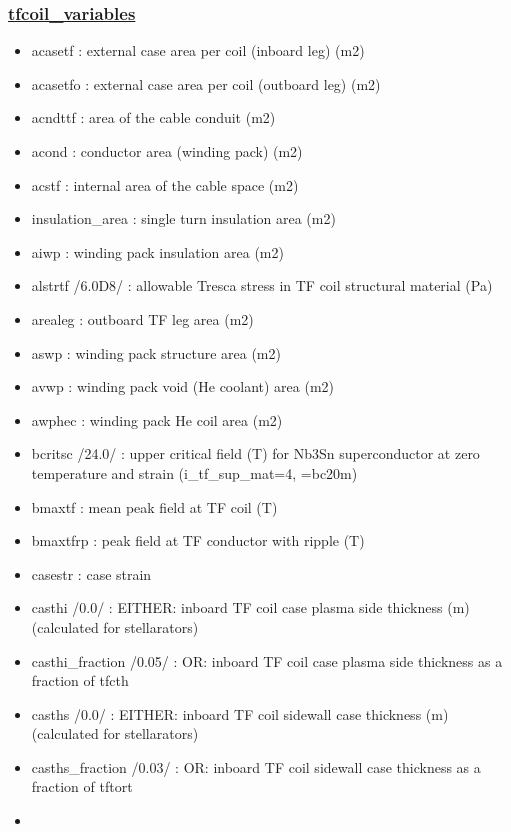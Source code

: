 \documentclass[]{article}
\begin{document}
\hypertarget{tfcoil_variables}{%
\subsubsection{\texorpdfstring{\href{tfcoil_variables.html}{tfcoil\_variables}}{tfcoil\_variables}}\label{tfcoil_variables}}

\begin{itemize}
\item
  acasetf : external case area per coil (inboard leg) (m2)
\item
  acasetfo : external case area per coil (outboard leg) (m2)
\item
  acndttf : area of the cable conduit (m2)
\item
  acond : conductor area (winding pack) (m2)
\item
  acstf : internal area of the cable space (m2)
\item
  insulation\_area : single turn insulation area (m2)
\item
  aiwp : winding pack insulation area (m2)
\item
  alstrtf /6.0D8/ : allowable Tresca stress in TF coil structural
  material (Pa)
\item
  arealeg : outboard TF leg area (m2)
\item
  aswp : winding pack structure area (m2)
\item
  avwp : winding pack void (He coolant) area (m2)
\item
  awphec : winding pack He coil area (m2)
\item
  bcritsc /24.0/ : upper critical field (T) for Nb3Sn superconductor at
  zero temperature and strain (i\_tf\_sup\_mat=4, =bc20m)
\item
  bmaxtf : mean peak field at TF coil (T)
\item
  bmaxtfrp : peak field at TF conductor with ripple (T)
\item
  casestr : case strain
\item
  casthi /0.0/ : EITHER: inboard TF coil case plasma side thickness (m)
  (calculated for stellarators)
\item
  casthi\_fraction /0.05/ : OR: inboard TF coil case plasma side
  thickness as a fraction of tfcth
\item
  casths /0.0/ : EITHER: inboard TF coil sidewall case thickness (m)
  (calculated for stellarators)
\item
  casths\_fraction /0.03/ : OR: inboard TF coil sidewall case thickness
  as a fraction of tftort
\item

\end{itemize}
\end{document}
